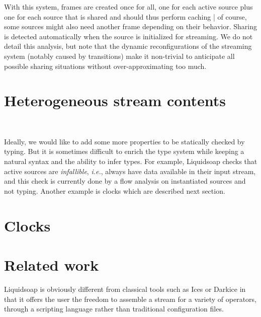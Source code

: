 \documentclass{llncs}
\newcommand{\liquidsoap}{Liquidsoap}
\newcommand{\ie}{\emph{i.e.},}
\begin{document}
With this system, frames are created once for all, one for each active source
plus one for each source that is shared and should thus perform caching |
of course, some sources might also need another frame
depending on their behavior.
Sharing is detected automatically when the source is initialized for
streaming. We do not detail this analysis, but note that the dynamic
reconfigurations of the streaming system (notably caused by transitions)
make it non-trivial to anticipate all possible sharing situations without
over-approximating too much.


\section{Heterogeneous stream contents}
\label{sec:content}



~

Ideally, we would like to add some more properties to be statically checked by
typing. But it is sometimes difficult to enrich the type system while keeping
a natural syntax and the ability to infer types.
For example,
\liquidsoap{} checks that active sources are \emph{infallible}, \ie{} always
have data available in their input stream, and this check is currently done by a
flow analysis on instantiated sources and not typing.
Another example is clocks which are described next
section.


\section{Clocks}
\label{sec:clocks}


\section{Related work} \label{sec:related}

\liquidsoap{} is obviously different from classical tools
such as Ices or Darkice in
that it offers the user the freedom to assemble a stream
for a variety of operators, through a scripting
language rather than traditional configuration files.
\end{document}
